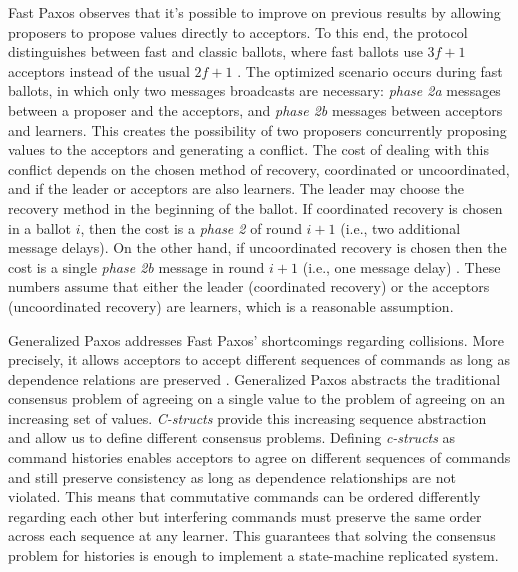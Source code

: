 \documentclass[runningheads,a4paper]{llncs}
\begin{document}
Fast Paxos observes that it's possible to improve on previous results by allowing proposers to propose values directly to acceptors. To this end, the protocol distinguishes between fast and classic ballots, where fast ballots use $3f+1$ acceptors instead of the usual $2f+1$ \cite{Lamport2006}. The optimized scenario occurs during fast ballots, in which only two messages broadcasts are necessary: \textit{phase 2a} messages between a proposer and the acceptors, and \textit{phase 2b}  messages between acceptors and learners. This creates the possibility of two proposers concurrently proposing values to the acceptors and generating a conflict. The cost of dealing with this conflict depends on the chosen method of recovery, coordinated or uncoordinated, and if the leader or acceptors are also learners. The leader may choose  the recovery method in the beginning of the ballot. If coordinated recovery is chosen in a ballot $i$, then the cost is a \textit{phase 2} of round $i+1$ (i.e., two additional message delays). On the other hand, if uncoordinated recovery is chosen then the cost is a single \textit{phase 2b} message in round $i+1$ (i.e., one message delay) \cite{Lamport2006}. These numbers assume that either the leader (coordinated recovery) or the acceptors (uncoordinated recovery) are learners, which is a reasonable assumption. \par
Generalized Paxos addresses Fast Paxos' shortcomings regarding collisions. More precisely, it allows acceptors to accept different sequences of commands as long as dependence relations are preserved \cite{Lamport2005}. Generalized Paxos abstracts the traditional consensus problem of agreeing on a single value to the problem of agreeing on an increasing set of values. \textit{C-structs} provide this increasing sequence abstraction and allow us to define different consensus problems.  \iffalse Additionally, given the two learners, $l_1$ and $l_2$, and their sequences of learned values, respectively, $learned[l_1]$ and $learned[l_2]$, consistency is maintained if $learned[l_1]$ and $learned[l_2]$ are always compatible, for all $l_1$ and $l_2$. \fi  Defining \textit{c-structs} as command histories enables acceptors to agree on different sequences of commands and still preserve consistency as long as dependence relationships are not violated. This means that commutative commands can be ordered differently regarding each other but interfering commands must preserve the same order across each sequence at any learner. This guarantees that solving the consensus problem for histories is enough to implement a state-machine replicated system. \par
\end{document}

